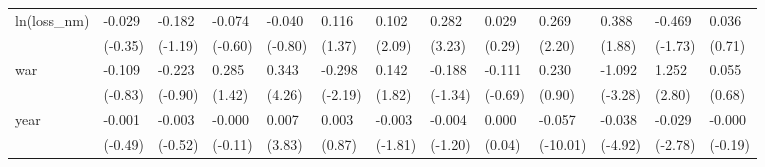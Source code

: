\begin{tabular}{p{1.5cm} p{1.7cm} p{1.7cm} p{1.7cm} p{1.7cm} p{1.7cm} p{1.7cm} p{1.7cm} p{1.7cm} p{1.7cm} p{1.7cm} p{1.7cm} p{1.7cm}}
\hline
ln(loss\_nm)     &   -0.029         &   -0.182         &   -0.074         &   -0.040         &    0.116         &    0.102\sym{*}  &    0.282\sym{**} &    0.029         &    0.269\sym{*}  &    0.388         &   -0.469         &    0.036         \\
                &  (-0.35)         &  (-1.19)         &  (-0.60)         &  (-0.80)         &   (1.37)         &   (2.09)         &   (3.23)         &   (0.29)         &   (2.20)         &   (1.88)         &  (-1.73)         &   (0.71)         \\
war             &   -0.109         &   -0.223         &    0.285         &    0.343\sym{***}&   -0.298\sym{*}  &    0.142         &   -0.188         &   -0.111         &    0.230         &   -1.092\sym{**} &    1.252\sym{**} &    0.055         \\
                &  (-0.83)         &  (-0.90)         &   (1.42)         &   (4.26)         &  (-2.19)         &   (1.82)         &  (-1.34)         &  (-0.69)         &   (0.90)         &  (-3.28)         &   (2.80)         &   (0.68)         \\
year            &   -0.001         &   -0.003         &   -0.000         &    0.007\sym{***}&    0.003         &   -0.003         &   -0.004         &    0.000         &   -0.057\sym{***}&   -0.038\sym{***}&   -0.029\sym{**} &   -0.000         \\
                &  (-0.49)         &  (-0.52)         &  (-0.11)         &   (3.83)         &   (0.87)         &  (-1.81)         &  (-1.20)         &   (0.04)         & (-10.01)         &  (-4.92)         &  (-2.78)         &  (-0.19)         \\
\end{tabular}
